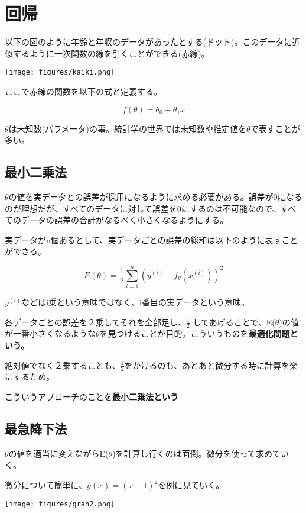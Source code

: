 \documentclass{jsarticle}
\begin{document}
\section{回帰}
以下の図のように年齢と年収のデータがあったとする(ドット)。このデータに近似するように一次関数の線を引くことができる(赤線)。

\begin{center}
  \texttt{[image: figures/kaiki.png]}
\end{center}

ここで赤線の関数を以下の式と定義する。

\[
	f(\theta) =  \theta_0  + \theta_1 x
\]

$\theta$は未知数(パラメータ)の事。統計学の世界では未知数や推定値を$\theta$で表すことが多い。

\subsection{最小二乗法}
$\theta$の値を実データとの誤差が採用になるように求める必要がある。誤差が0になるのが理想だが、すべてのデータに対して誤差を0にするのは不可能なので、すべてのデータの誤差の合計がなるべく小さくなるようにする。

実データがn個あるとして、実データごとの誤差の総和は以下のように表すことができる。

\[
	E(\theta) = \frac{1}{2} \sum_{i=1}^n(y^{(i)}-f_{\theta}(x^{(i)}))^{2}
\]

$y^{(i)}$などはi乗という意味ではなく、i番目の実データという意味。

各データごとの誤差を２乗してそれを全部足し、$ \frac{1}{2}$ してあげることで、E($\theta$)の値が一番小さくなるような$\theta$を見つけることが目的。こういうものを\bf{最適化問題}という。

絶対値でなく２乗することも、$\frac{1}{2}$をかけるのも、あとあと微分する時に計算を楽にするため。

こういうアプローチのことを\bf{最小二乗法という}

\subsection{最急降下法}
$\theta$の値を適当に変えながらE($\theta$)を計算し行くのは面倒。微分を使って求めていく。

微分について簡単に、$g(x)=(x-1)^{2}$を例に見ていく。

\begin{center}
  \texttt{[image: figures/grah2.png]}
\end{center}
\end{document}
